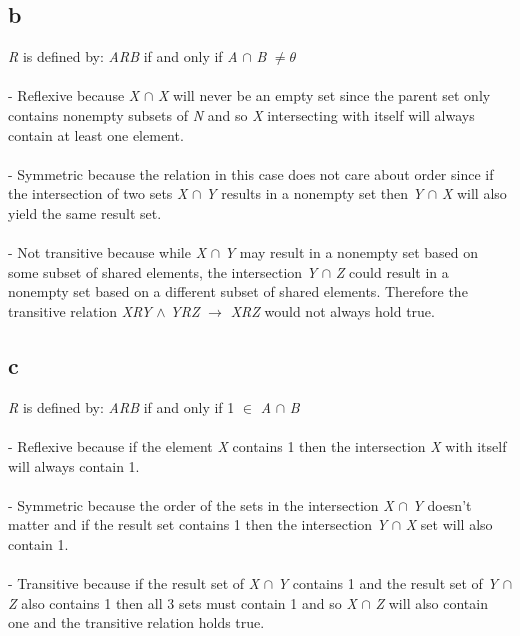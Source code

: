 \documentclass{article}
\begin{document}
\subsection*{b}
\textit{R} is defined by: \textit{ARB} if and only if \textit{A} $\cap$ \textit{B} $\neq \theta$  
\\\\  - Reflexive because \textit{X} $\cap$ \textit{X} will never be an empty set since the parent set only contains nonempty subsets of \textit{N} and so \textit{X} intersecting with itself will always contain at least one element.
\\\\  - Symmetric because the relation in this case does not care about order since if the intersection of two sets \textit{X} $\cap$ \textit{Y} results in a nonempty set then \textit{Y} $\cap$ \textit{X} will also yield the same result set.
\\\\  - Not transitive because while \textit{X} $\cap$ \textit{Y} may result in a nonempty set based on some subset of shared elements, the intersection \textit{Y} $\cap$ \textit{Z} could result in a nonempty set based on a different subset of shared elements. Therefore the transitive relation \textit{XRY} $\land$ \textit{YRZ} $\rightarrow$ \textit{XRZ} would not always hold true.
    
\subsection*{c}
\textit{R} is defined by: \textit{ARB} if and only if 1 $\in$ \textit{A} $\cap$ \textit{B} 
\\\\  - Reflexive because if the element \textit{X} contains 1 then the intersection \textit{X} with itself will always contain 1.
\\\\  - Symmetric because the order of the sets in the intersection \textit{X} $\cap$ \textit{Y} doesn't matter and if the result set contains 1 then the intersection \textit{Y} $\cap$ \textit{X} set will also contain 1.
\\\\  - Transitive because if the result set of \textit{X} $\cap$ \textit{Y} contains 1 and the result set of \textit{Y} $\cap$ \textit{Z} also contains 1 then all 3 sets must contain 1 and so \textit{X} $\cap$ \textit{Z} will also contain one and the transitive relation holds true.
\end{document}

